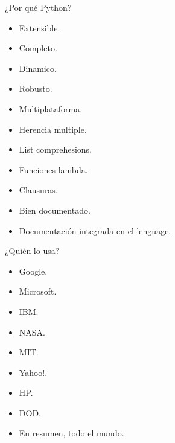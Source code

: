 \documentclass[10pt]{beamer}
\begin{document}
  \begin{frame}{¿Por qué Python?}
    \begin{itemize}
      \item Extensible.
      \item Completo.
      \item Dinamico.
      \item Robusto.
      \item Multiplataforma.
      \item Herencia multiple.
      \item List comprehesions.
      \item Funciones lambda.
      \item Clausuras.
      \item Bien documentado.
      \item Documentación integrada en el lenguage.
    \end{itemize}
  \end{frame}

  \begin{frame}{¿Quién lo usa?}
    \begin{itemize}
      \item Google.
      \item Microsoft.
      \item IBM.
      \item NASA.
      \item MIT.
      \item Yahoo!.
      \item HP.
      \item DOD.
      \item En resumen, todo el mundo.
    \end{itemize}
  \end{frame}
  
\end{document}
